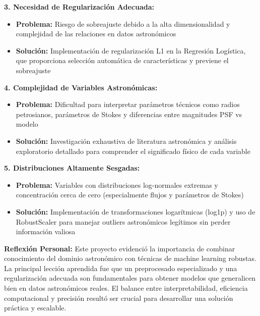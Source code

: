 \documentclass{article}
\begin{document}
\textbf{3. Necesidad de Regularización Adecuada:}
\begin{itemize}
    \item \textbf{Problema:} Riesgo de sobreajuste debido a la alta dimensionalidad y complejidad de las relaciones en datos astronómicos
    \item \textbf{Solución:} Implementación de regularización L1 en la Regresión Logística, que proporciona selección automática de características y previene el sobreajuste
\end{itemize}

\textbf{4. Complejidad de Variables Astronómicas:}
\begin{itemize}
    \item \textbf{Problema:} Dificultad para interpretar parámetros técnicos como radios petrosianos, parámetros de Stokes y diferencias entre magnitudes PSF vs modelo
    \item \textbf{Solución:} Investigación exhaustiva de literatura astronómica y análisis exploratorio detallado para comprender el significado físico de cada variable
\end{itemize}

\textbf{5. Distribuciones Altamente Sesgadas:}
\begin{itemize}
    \item \textbf{Problema:} Variables con distribuciones log-normales extremas y concentración cerca de cero (especialmente flujos y parámetros de Stokes)
    \item \textbf{Solución:} Implementación de transformaciones logarítmicas (log1p) y uso de RobustScaler para manejar outliers astronómicos legítimos sin perder información valiosa
\end{itemize}

\textbf{Reflexión Personal:}
Este proyecto evidenció la importancia de combinar conocimiento del dominio astronómico con técnicas de machine learning robustas. La principal lección aprendida fue que un preprocesado especializado y una regularización adecuada son fundamentales para obtener modelos que generalicen bien en datos astronómicos reales. El balance entre interpretabilidad, eficiencia computacional y precisión resultó ser crucial para desarrollar una solución práctica y escalable.

\newpage
\end{document}
